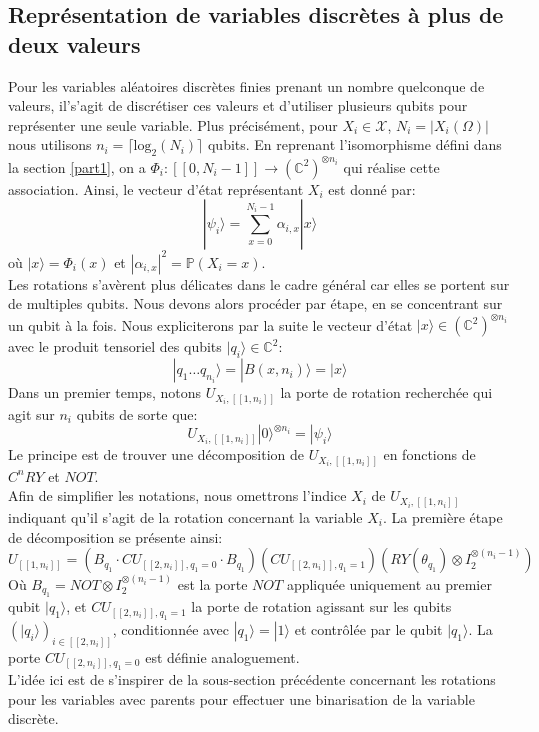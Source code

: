 \subsection{Représentation de variables discrètes à plus de deux valeurs}
\label{QBNgeneral}
Pour les variables aléatoires discrètes finies prenant un nombre quelconque de valeurs, il's'agit de discrétiser ces valeurs et d'utiliser plusieurs qubits pour représenter une seule variable. Plus précisément, pour $X_i \in \mathcal{X}$, $N_i = |X_i(\Omega)|$ nous utilisons $n_i = \lceil \mathrm{log}_2(N_i) \rceil$ qubits. En reprenant l'isomorphisme défini dans la section \ref{part1}, on a $\Phi_i:[\![0,N_i-1]\!] \rightarrow (\mathbb{C}^2)^{\otimes n_i}$ qui réalise cette association. 
Ainsi, le vecteur d'état représentant $X_i$ est donné par:
\[|\psi_i\rangle = \sum_{x=0}^{N_i-1}\alpha_{i,x}|x\rangle\]
où $|x\rangle = \Phi_i(x)$ et $|\alpha_{i,x}|^2 = \mathbb{P}(X_i=x)$. 
\\
Les rotations s'avèrent plus délicates dans le cadre général car elles se portent sur de multiples qubits. Nous devons alors procéder par étape, en se concentrant sur un qubit à la fois. 
Nous expliciterons par la suite le vecteur d'état $|x\rangle \in (\mathbb{C}^2)^{\otimes n_i}$ avec le produit tensoriel des qubits $|q_i\rangle \in \mathbb{C}^2$:
\[|q_1 \hdots q_{n_i}\rangle = |B(x,n_i)\rangle = |x\rangle \]
Dans un premier temps, notons $U_{X_i, [\![1,n_i]\!]}$ la porte de rotation recherchée qui agit sur $n_i$ qubits de sorte que:
\[U_{X_i, [\![1,n_i]\!]}|0\rangle^{\otimes n_i} = |\psi_i\rangle\]
Le principe est de trouver une décomposition de $U_{X_i, [\![1,n_i]\!]}$ en fonctions de $C^nRY$ et $NOT$. 
\\
Afin de simplifier les notations, nous omettrons l'indice $X_i$ de  $U_{X_i, [\![1,n_i]\!]}$ indiquant qu'il s'agit de la rotation concernant la variable $X_i$. La première étape de décomposition se présente ainsi:
\[U_{[\![1,n_i]\!]} = (B_{q_1} \cdot CU_{[\![2,n_i]\!],q_1=0} \cdot B_{q_1})(CU_{[\![2,n_i]\!],q_1=1})(RY(\theta_{q_1})\otimes I_2^{\otimes (n_i-1)})\]
Où $B_{q_1} = NOT \otimes I_2^{\otimes (n_i-1)}$ est la porte $NOT$ appliquée uniquement au premier qubit $|q_1\rangle$, et $CU_{[\![2,n_i]\!],q_1=1}$ la porte de rotation agissant sur les qubits $(|q_i\rangle)_{i\in[\![2,n_i]\!]}$, conditionnée avec $|q_1\rangle=|1\rangle$ et contrôlée par le qubit $|q_1\rangle$. La porte $CU_{[\![2,n_i]\!],q_1=0}$ est définie analoguement. 
\\
L'idée ici est de s'inspirer de la sous-section précédente concernant les rotations pour les variables avec parents pour effectuer une binarisation de la variable discrète.
